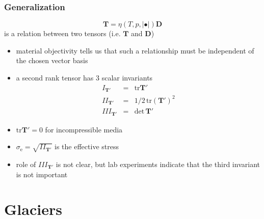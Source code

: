 \documentclass[hide notes,intlimits]{beamer}
\begin{document}
\begin{frame}
  \frametitle{Generalization}
  \begin{equation}
    \mathbf{T} = \eta\left(T,p,\vert \bullet \vert\right)\mathbf{D}
  \end{equation}
  is a relation between two tensors (i.e. $\mathbf{T}$ and $\mathbf{D}$)
  \begin{itemize}
  \item \alert{material objectivity} tells us that such a relationship must be independent of the chosen vector basis
  \item a second rank tensor has 3 scalar invariants
    \begin{eqnarray}
      I_{\mathbf{T}'} & = & \text{tr}\mathbf{T}' \\
      II_{\mathbf{T}'} & = & 1/2\,\text{tr}\left(\mathbf{T}'\right)^{2}\\
      III_{\mathbf{T}'} & = & \text{det}\,\mathbf{T}'
    \end{eqnarray}
    \item $\text{tr}\mathbf{T}'=0$ for incompressible media
    \item $\sigma_{\text{e}} = \sqrt{II_{\mathbf{T}'}}$ is the \alert{effective stress}
    \item role of $ III_{\mathbf{T}'}$ is not clear, but lab experiments indicate that the third invariant is not important
  \end{itemize}
\end{frame}



\section{Glaciers}
\end{document}
